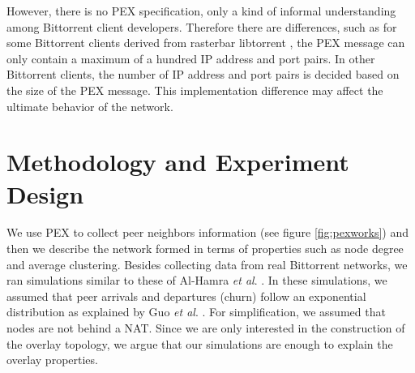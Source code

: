 \documentclass[10pt,conference,letterpaper]{IEEEtran}
\begin{document}
However,  there is no PEX specification, only a kind of informal understanding among Bittorrent client developers.
Therefore there are differences, such as for some Bittorrent clients derived from rasterbar libtorrent \cite{rasterbar}, the PEX message can only contain a maximum of a hundred IP address and port pairs. 
In other Bittorrent clients, the number of IP address and port pairs is decided based on the size of the PEX message.  
This implementation difference may affect the ultimate behavior of the network.

\section{Methodology and Experiment Design}\label{methodanddesign}

We use PEX to collect peer neighbors information  (see figure \ref{fig:pexworks}) and then we describe the network formed in terms of properties such as node degree and average clustering. 
Besides collecting data from real Bittorrent networks, we ran simulations similar to these of Al-Hamra \textit{et al}. \cite{al2009swarming}. 
In these simulations, we assumed that peer arrivals and departures (churn) follow an exponential distribution as explained by Guo \textit{et al}. \cite{guo2005measurements}. 
For simplification, we assumed that nodes are not behind a NAT.
Since we are only interested in the construction of the overlay topology, we argue that our simulations are enough to explain the overlay properties.
\end{document}
